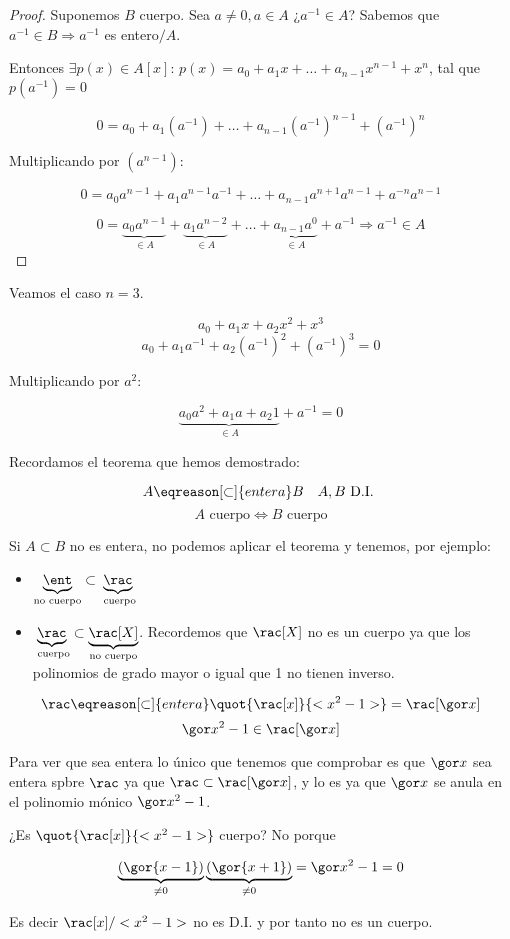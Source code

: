 \begin{proof}
		\proofpart{$\Leftarrow$}

		Suponemos $B$ cuerpo. Sea $a \neq 0,a \in A$ ¿$a^{-1} \in A$? Sabemos que $a^{-1} \in B \Rightarrow a^{-1}$ es entero$/A$.

		Entonces $\exists p(x) \in A[x]$: $p(x) = a_0 + a_1x + … + a_{n-1}x^{n-1} + x^n $, tal que $p(a^{-1})=0$

		\[ 0 = a_0 + a_1(a^{-1}) + … + a_{n-1}(a^{-1})^{n-1} + (a^{-1})^n \]

		Multiplicando por $(a^{n-1})$:

		\[ 0 = a_0 a^{n-1} + a_1 a^{n-1} a^{-1} + … + a_{n-1} a^{n+1} a^{n-1} + a^{-n} a^{n-1} \]

		\[ 0 = \underbrace{a_0 a^{n-1}}_{\in A} + \underbrace{a_1 a^{n-2}}_{\in A} + … + \underbrace{a_{n-1}a^0}_{\in A} + a^{-1} \Rightarrow a^{-1} \in A \]


	\end{proof}

	\begin{example}
		Veamos el caso $n = 3$.

		\[ a_0 + a_1 x + a_2 x^2 + x^3 \]
		\[ a_0 + a_1 a^{-1} + a_2 (a^{-1})^2  + (a^{-1})^3 = 0 \]

		Multiplicando por $a^2$:

		\[ \underbrace{a_0 a^2 + a_1 a + a_2 1}_{\in A} + a^{-1} = 0\]
	\end{example}

	Recordamos el teorema que hemos demostrado:

	\[ A \eqreason[\subset]{entera} B \quad A,B \text{ D.I. }\]
	\[ A \text{ cuerpo} \Leftrightarrow B \text{ cuerpo} \]

	\begin{example}[1]
		Si $A \subset B$ no es entera, no podemos aplicar el teorema y tenemos, por ejemplo:
		\begin{itemize}
			\item $\underbrace{\ent}_{\text{no cuerpo}} \subset \underbrace{\rac}_{\text{ cuerpo}}$
			\item $\underbrace{\rac}_{\text{ cuerpo}} \subset \underbrace{\rac[X]}_{\text{no cuerpo}}$. Recordemos que $\rac[X]$ no es un cuerpo ya que los polinomios de grado mayor o igual que 1 no tienen inverso.
		\end{itemize}
	\end{example}

	\begin{example}[2]
		\[ \rac \eqreason[\subset]{entera} \quot{\rac[x]}{<x^2-1>} = \rac[\cls{x}] \]
		\[ \cls{x}^2 - 1 \in \rac[\cls{x}] \]

		Para ver que sea entera lo único que tenemos que comprobar es que $\cls{x}$ sea entera spbre $\rac$ ya que $\rac \subset \rac[\cls{x}]$, y lo es ya que  $\cls{x}$ se anula en el polinomio mónico $\cls{x}^2 - 1$.

		¿Es $\quot{\rac[x]}{<x^2-1>}$ cuerpo? No porque

		\[ \underbrace{(\gor{x-1})}_{\neq 0} \underbrace{(\gor{x+1})}_{\neq 0}  = \cls{x^2-1} = 0\]

		Es decir $\rac[x]/<x^2-1>$ no es D.I. y por tanto no es un cuerpo.
	\end{example}

